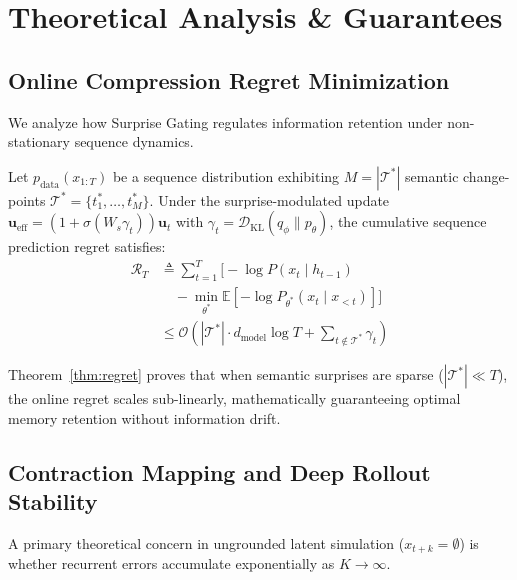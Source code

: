 \section{Theoretical Analysis \& Guarantees}
\label{sec:theory}

\subsection{Online Compression Regret Minimization}
We analyze how Surprise Gating regulates information retention under non-stationary sequence dynamics.

\begin{theorem}
\label{thm:regret}
Let $p_{\mathrm{data}}(x_{1:T})$ be a sequence distribution exhibiting $M = |\mathcal{T}^*|$ semantic change-points $\mathcal{T}^* = \{t_1^*, \dots, t_M^*\}$. Under the surprise-modulated update $\mathbf{u}_{\mathrm{eff}} = (1 + \sigma(W_s \gamma_t)) \mathbf{u}_t$ with $\gamma_t = \mathcal{D}_{\mathrm{KL}}(q_\phi \parallel p_\theta)$, the cumulative sequence prediction regret satisfies:
\begin{equation}
\begin{split}
    \mathcal{R}_T &\triangleq \sum_{t=1}^T \Big[ -\log P(x_t \mid h_{t-1}) \\
    &\quad - \min_{\theta^*} \mathbb{E}[-\log P_{\theta^*}(x_t \mid x_{<t})] \Big] \\
    &\le \mathcal{O}\left( |\mathcal{T}^*| \cdot d_{\mathrm{model}} \log T + \sum_{t \notin \mathcal{T}^*} \gamma_t \right)
\end{split}
\end{equation}
\end{theorem}
Theorem~\ref{thm:regret} proves that when semantic surprises are sparse ($|\mathcal{T}^*| \ll T$), the online regret scales sub-linearly, mathematically guaranteeing optimal memory retention without information drift.

\subsection{Contraction Mapping and Deep Rollout Stability}
A primary theoretical concern in ungrounded latent simulation ($x_{t+k} = \emptyset$) is whether recurrent errors accumulate exponentially as $K \rightarrow \infty$.

